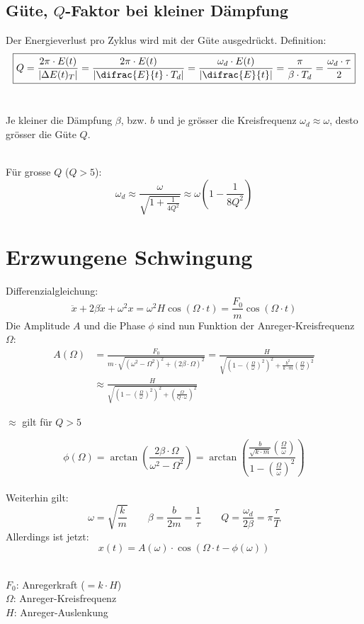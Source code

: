\subsection{Güte, $Q$-Faktor bei kleiner Dämpfung}
Der Energieverlust pro Zyklus wird mit der Güte ausgedrückt. Definition:
\[\boxed{
	Q = \frac{2\pi \cdot E(t)}{\left| \Delta E(t)_T \right|}
	  = \frac{2\pi \cdot E(t)}{\left| \difrac{E}{t} \cdot T_d \right|}
	  = \frac{\omega_d \cdot E(t)}{\left| \difrac{E}{t} \right|}
	  = \frac{\pi}{\beta \cdot T_d}
	  = \frac{\omega_d \cdot \tau}{2}
}\]
\\
\begin{footnotesize}
	Je kleiner die Dämpfung $\beta$, bzw. $b$ und je grösser die Kreisfrequenz $\omega_d \approx \omega$, desto grösser die Güte $Q$.
\end{footnotesize}
\\
Für grosse $Q$ ($Q>5$):
\[\boxed{
	\omega_d \approx \frac{\omega}{\sqrt{1 + \frac{1}{4Q^2}}} \approx \omega \left( 1 - \frac{1}{8Q^2} \right)
}\]


\section{Erzwungene Schwingung}
Differenzialgleichung:
\[
	\ddot{x} + 2\beta \dot{x} + \omega^2x = \omega^2 H \cos(\Omega \cdot t) = \frac{F_0}{m} \cos(\Omega \cdot t)
\]
Die Amplitude $A$ und die Phase $\phi$ sind nun Funktion der Anreger-Kreisfrequenz $\Omega$:
\[\boxed{\begin{aligned}
	A(\Omega) &= \frac{F_0}{m \cdot \sqrt{\left(\omega^2 -        \Omega^2\right)^2 + \left(2\beta \cdot \Omega\right)^2}}
	          = \frac{H}{\sqrt{\left(1- \left(\frac{\Omega}{\omega}\right)^2\right)^2+\frac{b^2}{k\cdot m} \left( \frac{\Omega}{\omega} \right)^2}}\\
	&\approx \frac{H}{\sqrt{\left(1- \left(\frac{\Omega}{\omega}\right)^2\right)^2+\left( \frac{\Omega}{Q\cdot\omega} \right)^2}}
\end{aligned}}\]
\begin{footnotesize}
	$\approx$ gilt für $Q>5$
\end{footnotesize}

\[\boxed{
	\phi(\Omega) = \arctan \left( \frac{2\beta \cdot \Omega}{\omega^2 - \Omega^2} \right)
		= \arctan \left( \frac{\frac{b}{\sqrt{k \cdot m}} \left( \frac{\Omega}{\omega} \right)}{1 - \left(\frac{\Omega}{\omega}\right)^2 } \right)
}\]
\\
Weiterhin gilt:
\[
	\omega = \sqrt{\frac{k}{m}} \qquad
	\beta = \frac{b}{2m} = \frac{1}{\tau} \qquad
	Q = \frac{\omega_d}{2\beta} = \pi \frac{\tau}{T}
\]
Allerdings ist jetzt:
\[\boxed{
	x(t) = A(\omega) \cdot \cos(\Omega \cdot t - \phi(\omega))
}\]
\\
\begin{footnotesize}
	$F_0$: Anregerkraft ($=k \cdot H$)\\
	$\Omega$: Anreger-Kreisfrequenz\\
	$H$: Anreger-Auslenkung
\end{footnotesize}



